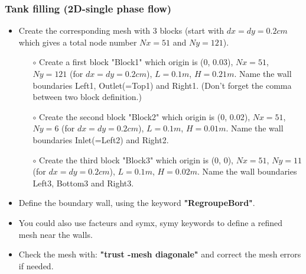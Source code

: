 \documentclass[10pt]{beamer}
\begin{document}
\begin{frame}
\frametitle{Tank filling (2D-single phase flow)}
\begin{block}{}

\begin{itemize}
\item Create the corresponding mesh with 3 blocks (start with $dx=dy=0.2cm$ which gives a total node number $Nx=51$ and $Ny=121$). 
    \begin{itemize}
    \item [$\circ$] Create a first block "Block1" which origin is (0, 0.03), $Nx=51$, $Ny=121$ (for $dx=dy=0.2cm$), $L=0.1 m$, $H=0.21 m$. Name the wall boundaries Left1, Outlet(=Top1) and Right1. (Don't forget the comma between two block definition.)
    \item [$\circ$] Create the second block "Block2" which origin is (0, 0.02), $Nx=51$, $Ny=6$ (for $dx=dy=0.2cm$), $L=0.1 m$, $H=0.01 m$. Name the wall boundaries Inlet(=Left2) and Right2.
    \item [$\circ$] Create the third block "Block3" which origin is (0, 0), $Nx=51$, $Ny=11$ (for $dx=dy=0.2cm$), $L=0.1 m$, $H=0.02 m$. Name the wall boundaries Left3, Bottom3 and Right3.
    \end{itemize}
\item Define the boundary wall, using the keyword \textbf{"RegroupeBord"}.
\item You could also use facteurs and symx, symy keywords to define a refined mesh near the walls. 
\item Check the mesh with: \textbf{"trust -mesh diagonale"} and correct the mesh errors if needed.
\end{itemize}

\end{block}
\end{frame}
\end{document}
